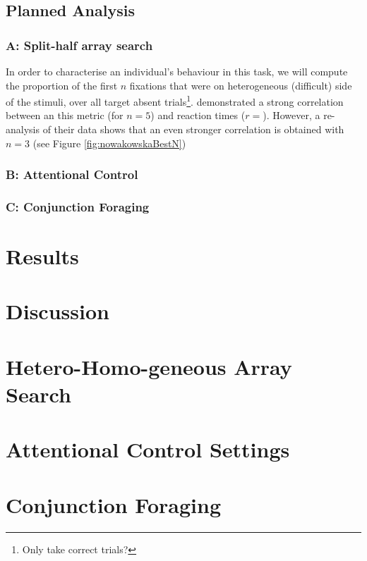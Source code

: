 \documentclass[a4paper, oneside, 11pt, onecolumn]{article}
\begin{document}
\subsection{Planned Analysis}

\subsubsection{A: Split-half array search}

In order to characterise an individual's behaviour in this task, we will compute the proportion of the first $n$ fixations that were on heterogeneous (difficult) side of the stimuli, over all target absent trials\footnote{Only take correct trials?}. \cite{nowakowsak2017} demonstrated a strong correlation between an this metric (for $n=5$) and reaction times ($r=$). However, a re-analysis of their data shows that an even stronger correlation is obtained with $n=3$ (see Figure \ref{fig:nowakowskaBestN})

\subsubsection{B: Attentional Control}

\subsubsection{C: Conjunction Foraging}


\section{Results}

\section{Discussion}


\begin{appendices}
\section{Hetero-Homo-geneous Array Search}

\section{Attentional Control Settings}

\section{Conjunction Foraging}
\end{appendices}



\end{document}
